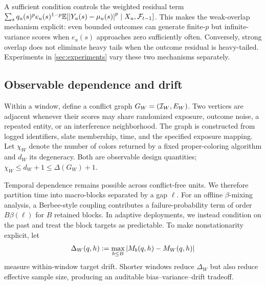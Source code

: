 A sufficient condition controls the weighted residual term
$\sum_s q_u(s)^p e_u(s)^{1-p}
\mathbb{E}[\left|Y_u(s)-\mu_u(s)\right|^p\mid X_u,\mathcal{F}_{t-1}]$.
This makes the weak-overlap mechanism explicit: even bounded outcomes can generate finite-$p$ but infinite-variance scores when $e_u(s)$ approaches zero sufficiently often. Conversely, strong overlap does not eliminate heavy tails when the outcome residual is heavy-tailed. Experiments in \cref{sec:experiments} vary these two mechanisms separately.

\subsection{Observable dependence and drift}
Within a window, define a conflict graph $G_W=(\mathcal{I}_W,E_W)$. Two vertices are adjacent whenever their scores may share randomized exposure, outcome noise, a repeated entity, or an interference neighborhood. The graph is constructed from logged identifiers, slate membership, time, and the specified exposure mapping. Let $\chi_W$ denote the number of colors returned by a fixed proper-coloring algorithm and $d_W$ its degeneracy. Both are observable design quantities; $\chi_W\le d_W+1\le\Delta(G_W)+1$.

Temporal dependence remains possible across conflict-free units. We therefore partition time into macro-blocks separated by a gap $\ell$. For an offline $\beta$-mixing analysis, a Berbee-style coupling contributes a failure-probability term of order $B\beta(\ell)$ for $B$ retained blocks. In adaptive deployments, we instead condition on the past and treat the block targets as predictable. To make nonstationarity explicit, let
\begin{equation}
\Delta_W(q,h)
:=\max_{b\le B}
\left|M_b(q,h)-M_W(q,h)\right|
\label{eq:drift}
\end{equation}
measure within-window target drift. Shorter windows reduce $\Delta_W$ but also reduce effective sample size, producing an auditable bias--variance--drift tradeoff.
